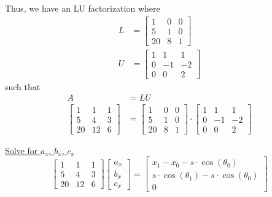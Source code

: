 \documentclass[12pt, letterpaper]{article}
\begin{document}
Thus, we have an LU factorization where
\begin{align*}
L &= \begin{bmatrix}
1 & 0 & 0 \\
5 & 1 & 0 \\
20 & 8 & 1
\end{bmatrix} \\
U &= \begin{bmatrix}
1 & 1 & 1 \\
0 & -1 & -2 \\
0 & 0 & 2
\end{bmatrix}
\end{align*}
such that 
\begin{align*}
A &= LU \\
\begin{bmatrix}
1 & 1 & 1 \\
5 & 4 & 3 \\
20 & 12 & 6
\end{bmatrix}
&= \begin{bmatrix}
1 & 0 & 0 \\
5 & 1 & 0 \\
20 & 8 & 1
\end{bmatrix}
\cdot \begin{bmatrix}
1 & 1 & 1 \\
0 & -1 & -2 \\
0 & 0 & 2
\end{bmatrix}
\end{align*}

\newpage
\underline{Solve for \(a_x\), \(b_x\), \(c_x\)}
\begin{equation*}
\begin{bmatrix}
1 & 1 & 1 \\
5 & 4 & 3 \\
20 & 12 & 6
\end{bmatrix}
\begin{bmatrix}
a_x \\ b_x \\ c_x
\end{bmatrix}
= \begin{bmatrix}
x_1 - x_0 - s \cdot \cos(\theta_0) \\
s \cdot \cos(\theta_1) - s \cdot \cos(\theta_0) \\
0
\end{bmatrix}
\end{equation*}
\end{document}
